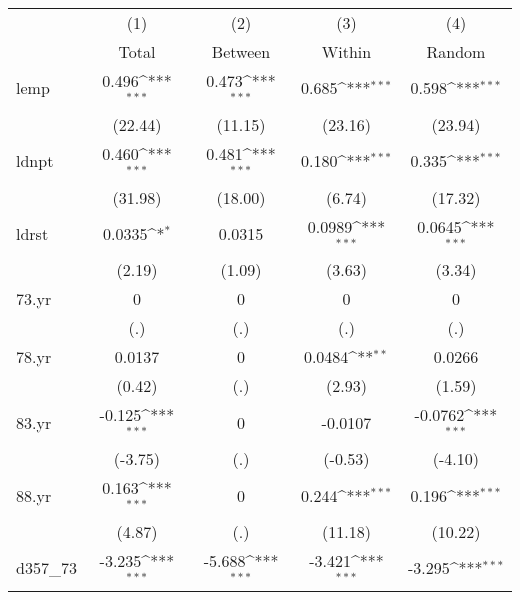 {
\def\sym#1{\ifmmode^{#1}\else\(^{#1}\)\fi}
\begin{tabular}{l*{4}{c}}
\hline\hline
            &\multicolumn{1}{c}{(1)}&\multicolumn{1}{c}{(2)}&\multicolumn{1}{c}{(3)}&\multicolumn{1}{c}{(4)}\\
            &\multicolumn{1}{c}{Total}&\multicolumn{1}{c}{Between}&\multicolumn{1}{c}{Within}&\multicolumn{1}{c}{Random}\\
\hline
lemp        &       0.496\sym{***}&       0.473\sym{***}&       0.685\sym{***}&       0.598\sym{***}\\
            &     (22.44)         &     (11.15)         &     (23.16)         &     (23.94)         \\
[1em]
ldnpt       &       0.460\sym{***}&       0.481\sym{***}&       0.180\sym{***}&       0.335\sym{***}\\
            &     (31.98)         &     (18.00)         &      (6.74)         &     (17.32)         \\
[1em]
ldrst       &      0.0335\sym{*}  &      0.0315         &      0.0989\sym{***}&      0.0645\sym{***}\\
            &      (2.19)         &      (1.09)         &      (3.63)         &      (3.34)         \\
[1em]
73.yr       &           0         &           0         &           0         &           0         \\
            &         (.)         &         (.)         &         (.)         &         (.)         \\
[1em]
78.yr       &      0.0137         &           0         &      0.0484\sym{**} &      0.0266         \\
            &      (0.42)         &         (.)         &      (2.93)         &      (1.59)         \\
[1em]
83.yr       &      -0.125\sym{***}&           0         &     -0.0107         &     -0.0762\sym{***}\\
            &     (-3.75)         &         (.)         &     (-0.53)         &     (-4.10)         \\
[1em]
88.yr       &       0.163\sym{***}&           0         &       0.244\sym{***}&       0.196\sym{***}\\
            &      (4.87)         &         (.)         &     (11.18)         &     (10.22)         \\
[1em]
d357\_73     &      -3.235\sym{***}&      -5.688\sym{***}&      -3.421\sym{***}&      -3.295\sym{***}\\

\end{tabular}}
